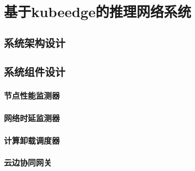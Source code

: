 \chapter{基于kubeedge的推理网络系统}

\section{系统架构设计}



\section{系统组件设计}

\subsection{节点性能监测器}

\subsection{网络时延监测器}

\subsection{计算卸载调度器}

\subsection{云边协同网关}
